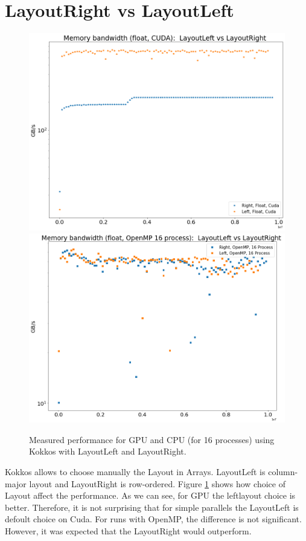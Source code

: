 \documentclass{article}
\begin{document}
 \section{ LayoutRight vs LayoutLeft }
 \begin{figure}[h]
 	\includegraphics[scale=0.27]{memory_lr_cuda.png} 
 	\includegraphics[scale=0.27]{memory_lr_openmp_16.png}  
 	\caption{ Measured performance for GPU and CPU (for 16 processes) using Kokkos with LayoutLeft and LayoutRight.  }
 	\label{leftorright}
 \end{figure}
Kokkos allows to choose manually the Layout in Arrays. LayoutLeft is  column-major layout and LayoutRight is row-ordered. 
Figure \ref{leftorright} shows how choice of Layout affect the performance. As we can see, for GPU the leftlayout choice is better. Therefore, it is not surprising that for simple parallels the LayoutLeft is defoult choice on Cuda. For runs with OpenMP, the difference is not significant. However, it was expected that the LayoutRight would outperform. 
\end{document}
